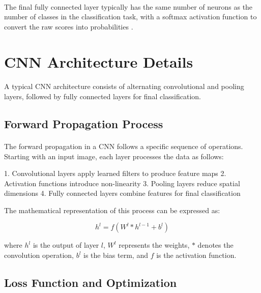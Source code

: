 \paragraph{}
The final fully connected layer typically has the same number of neurons as the number of classes in the classification task, with a softmax activation function to convert the raw scores into probabilities \cite{goodfellow2016deep}.

\section{CNN Architecture Details}
\label{sec:cnn-architecture-details}

\paragraph{}
A typical CNN architecture consists of alternating convolutional and pooling layers, followed by fully connected layers for final classification. 


\subsection{Forward Propagation Process}
\label{subsec:forward-propagation}

\paragraph{}
The forward propagation in a CNN follows a specific sequence of operations. Starting with an input image, each layer processes the data as follows:

1. Convolutional layers apply learned filters to produce feature maps
2. Activation functions introduce non-linearity
3. Pooling layers reduce spatial dimensions
4. Fully connected layers combine features for final classification

The mathematical representation of this process can be expressed as:

\[
h^l = f(W^l * h^{l-1} + b^l)
\]

where $h^l$ is the output of layer $l$, $W^l$ represents the weights, $*$ denotes the convolution operation, $b^l$ is the bias term, and $f$ is the activation function.

\subsection{Loss Function and Optimization}
\label{subsec:loss-optimization}

